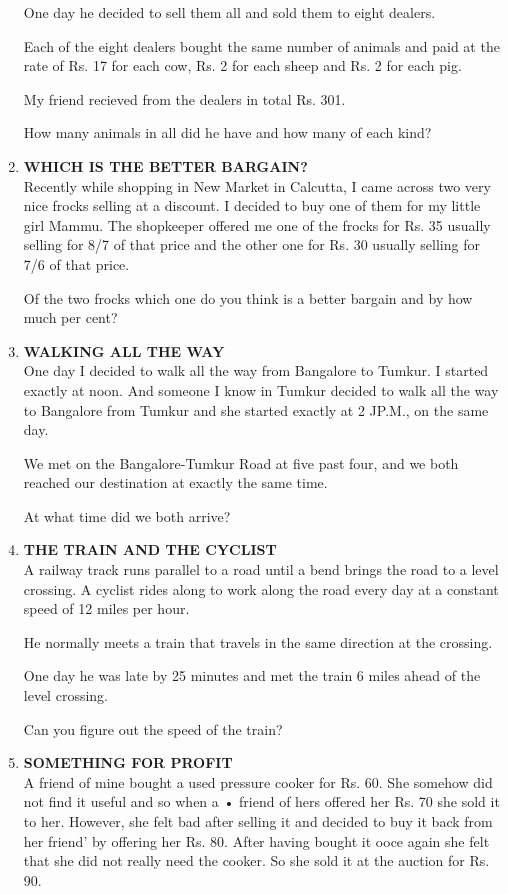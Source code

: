 \documentclass[12pt]{article}
\begin{document}
\begin{enumerate}
One day he decided  to sell them  all and sold  them  to eight  dealers. 

Each  of the eight  dealers  bought  the same  number  of animals  and  paid  at the  rate  of Rs. 17 for  each  cow, Rs. 2 for each  sheep  and Rs. 2 for each  pig. 

My friend  recieved  from  the  dealers  in total  Rs. 301. 

How  many  animals  in all did he have  and  how  many of each  kind? 
%
\item \textbf{WHICH  IS THE  BETTER  BARGAIN?} \\
Recently  while  shopping  in New  Market  in Calcutta, I came  across  two very  nice  frocks  selling  at a discount. I decided  to buy  one  of them  for my little  girl Mammu. The shopkeeper  offered  me one of the  frocks  for Rs.  35 usually  selling  for 8/7 of  that  price  and the other  one for 
Rs. 30 usually  selling  for  7/6 of that  price. 

Of the two frocks  which  one do you think  is a better bargain  and by how  much  per cent? 
%
\item \textbf{WALKING  ALL  THE  WAY} \\
One day I decided  to walk  all the  way  from  Bangalore to Tumkur.  I started  exactly  at noon.  And  someone  I know  in Tumkur  decided  to walk  all the way  to Bangalore from  Tumkur  and  she  started  exactly  at 2 JP.M.,  on the same  day. 

We met  on the  Bangalore-Tumkur  Road  at five past four,  and we both  reached  our destination  at exactly  the same  time. 

At what  time  did we both  arrive? 
%
\item \textbf{THE  TRAIN  AND  THE  CYCLIST} \\
A railway  track  runs  parallel  to a road  until  a bend brings  the road  to a level  crossing.  A cyclist  rides  along to work  along  the road  every  day at a constant  speed  of 12 miles  per hour. 

He normally  meets  a train  that  travels  in the same direction  at the crossing. 

One day he was late by 25 minutes  and  met  the  train 6 miles  ahead  of the level  crossing.  

Can  you  figure  out the speed  of the train? 
%
\item \textbf{SOMETHING  FOR  PROFIT} \\
A friend  of mine  bought  a used  pressure  cooker  for Rs. 60. She  somehow  did not find  it useful  and so when a • friend  of hers  offered  her Rs. 70 she sold  it to her. However,  she felt bad after  selling  it and decided  to buy it back  from  her  friend'  by offering  her Rs.  80. After having  bought  it ooce  again  she felt that she did not really need the  cooker.  So  she  sold  it at the  auction  for Rs. 90. 


\end{enumerate}
\end{document}
